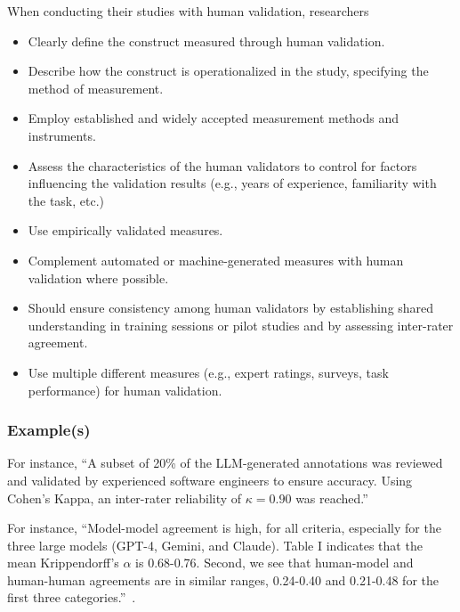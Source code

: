 When conducting their studies with human validation, researchers

\must
\begin{itemize}
    \item Clearly define the construct measured through human validation.
    \item Describe how the construct is operationalized in the study, specifying the method of measurement.
    \item Employ established and widely accepted measurement methods and instruments.
\end{itemize}

\should
\begin{itemize}
    \item Assess the characteristics of the human validators to control for factors influencing the validation results (e.g., years of experience, familiarity with the task, etc.)
    \item Use empirically validated measures.
    \item Complement automated or machine-generated measures with human validation where possible.
    \item Should ensure consistency among human validators by establishing shared understanding in training sessions or pilot studies and by assessing inter-rater agreement.
\end{itemize}

\may
\begin{itemize}
    \item Use multiple different measures (e.g., expert ratings, surveys, task performance) for human validation.
\end{itemize}

\subsubsection{Example(s)}

For instance, ``A subset of 20\% of the LLM-generated annotations was reviewed and validated by experienced software engineers to ensure accuracy. Using Cohen's Kappa, an inter-rater reliability of $\kappa = 0.90$ was reached.'' 

For instance, ``Model-model agreement is high, for all criteria, especially for the three large models (GPT-4, Gemini, and Claude). Table I indicates that the mean Krippendorff’s $\alpha$ is 0.68-0.76. 
Second, we see that human-model and human-human agreements are in similar ranges, 0.24-0.40 and 0.21-0.48
for the first three categories.''~\cite{DBLP:journals/corr/abs-2408-05534}.

